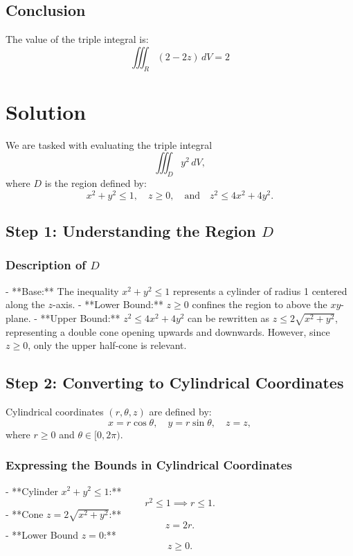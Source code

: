 \documentclass[11pt]{article}
\begin{document}
\subsection{Conclusion}

The value of the triple integral is:
\[
\iiint_{R} (2 - 2z) \, dV = 2
\]




\newpage

\section{Solution}

We are tasked with evaluating the triple integral
\[
\iiint_{D} y^2 \, dV,
\]
where \( D \) is the region defined by:
\[
x^2 + y^2 \leq 1, \quad z \geq 0, \quad \text{and} \quad z^2 \leq 4x^2 + 4y^2.
\]

\newpage

\subsection{Step 1: Understanding the Region \( D \)}

\subsubsection{Description of \( D \)}
- **Base:** The inequality \( x^2 + y^2 \leq 1 \) represents a cylinder of radius 1 centered along the \( z \)-axis.
- **Lower Bound:** \( z \geq 0 \) confines the region to above the \( xy \)-plane.
- **Upper Bound:** \( z^2 \leq 4x^2 + 4y^2 \) can be rewritten as \( z \leq 2\sqrt{x^2 + y^2} \), representing a double cone opening upwards and downwards. However, since \( z \geq 0 \), only the upper half-cone is relevant.

\newpage

\subsection{Step 2: Converting to Cylindrical Coordinates}

Cylindrical coordinates \((r, \theta, z)\) are defined by:
\[
x = r\cos\theta, \quad y = r\sin\theta, \quad z = z,
\]
where \( r \geq 0 \) and \( \theta \in [0, 2\pi) \).

\subsubsection{Expressing the Bounds in Cylindrical Coordinates}
- **Cylinder \( x^2 + y^2 \leq 1 \):**
  \[
  r^2 \leq 1 \implies r \leq 1.
  \]
- **Cone \( z = 2\sqrt{x^2 + y^2} \):**
  \[
  z = 2r.
  \]
- **Lower Bound \( z = 0 \):**
  \[
  z \geq 0.
  \]
\end{document}
